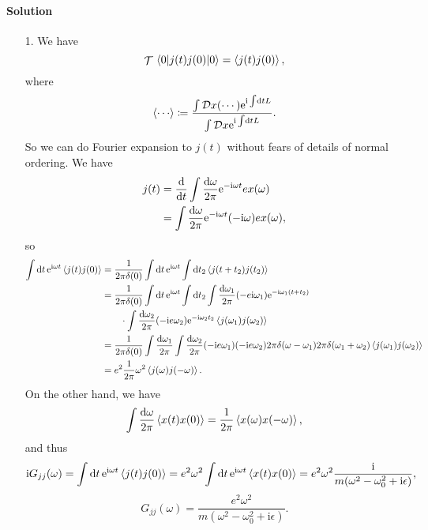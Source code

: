 \documentclass[hyperref, a4paper]{article}
\DeclareMathOperator{\timeorder}{\mathcal{T}}
\newcommand*{\ii}{\mathrm{i}}
\newcommand*{\ee}{\mathrm{e}}
\newcommand*{\fd}[1]{\mathcal{D} #1}
\begin{document}
\paragraph{Solution} \begin{itemize}
\item[1.] We have 
\[
    \timeorder \expval{j(t) j(0)}{0} = \expval{j(t) j(0)} ,
\]
where 
\[
    \expval{\cdots} \coloneqq 
    \frac{\int \fd{x} (\cdots) \ee^{\ii \int \dd{t} L}}{\int \fd{x} \ee^{\ii \int \dd{t} L}}.
\]
So we can do Fourier expansion to $j(t)$ without fears of details of normal ordering.
We have 
\[
    \begin{aligned}
        j(t) &= \dv{t} \int \frac{\dd{\omega}}{2\pi} \ee^{- \ii \omega t} e x(\omega) \\
        &= \int \frac{\dd{\omega}}{2\pi} \ee^{- \ii \omega t}
        (- \ii \omega) e x(\omega),
    \end{aligned}
\]
so 
\[
    \begin{aligned}
        \int \dd{t} \ee^{\ii \omega t} \expval{j(t) j(0)} &= 
        \frac{1}{2\pi \delta(0)} \int \dd{t} \ee^{\ii \omega t} \int \dd{t_2}
        \expval{j(t + t_2) j(t_2)} \\
        &= \frac{1}{2\pi \delta(0)} \int \dd{t} \ee^{\ii \omega t} \int \dd{t_2}
        \int \frac{\dd{\omega_1}}{2\pi} (- e \ii \omega_1) \ee^{- \ii \omega_1 (t + t_2)} \\
        &\quad \quad \cdot \int \frac{\dd{\omega_2}}{2\pi} (- \ii e \omega_2) \ee^{- \ii \omega_2 t_2}
        \expval{j(\omega_1) j(\omega_2)} \\
        &= \frac{1}{2\pi \delta(0)} \int \frac{\dd{\omega_1}}{2\pi} \int \frac{\dd{\omega_2}}{2\pi}
        (- \ii e \omega_1) (- \ii e \omega_2) 
        2\pi \delta (\omega - \omega_1) 2\pi \delta (\omega_1 + \omega_2) 
        \expval{j(\omega_1) j(\omega_2)} \\
        &= e^2 \frac{1}{2\pi} \omega^2 \expval{j(\omega) j(- \omega)}.
    \end{aligned}
\]
On the other hand, we have 
\[
    \int \frac{\dd{\omega}}{2\pi} \expval{x(t) x(0)} 
    = \frac{1}{2\pi} \expval{x(\omega) x(-\omega)},
\]
and thus 
\begin{equation}
    \ii G_{jj}(\omega) = \int \dd{t} \ee^{\ii \omega t} \expval{j(t) j(0)} = 
    e^2 \omega^2 \int \dd{t} \ee^{\ii \omega t} \expval{x(t) x(0)}
    = e^2 \omega^2 \frac{\ii}{m (\omega^2 - \omega_0^2 + \ii \epsilon)},
    \label{eq:g-jj-derivation-final}
\end{equation}
\begin{equation}
    G_{jj}(\omega) = \frac{e^2 \omega^2}{m (\omega^2 - \omega_0^2 + \ii \epsilon)}.
\end{equation}


\end{itemize}
\end{document}
